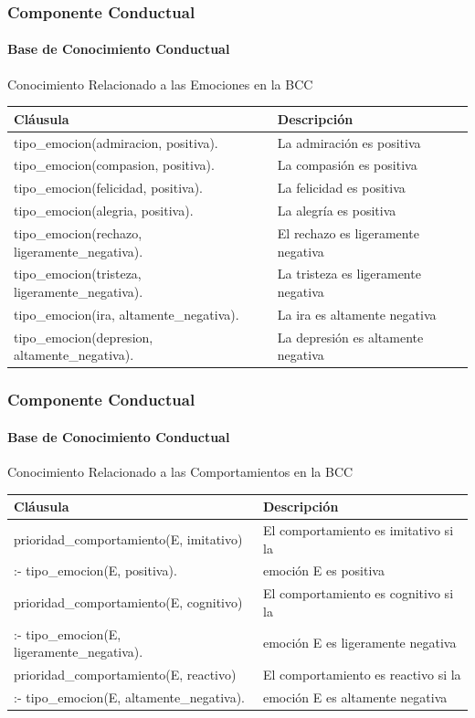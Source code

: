 \documentclass{beamer}
\begin{document}
\begin{frame}
\frametitle{Componente Conductual}
\framesubtitle{Base de Conocimiento Conductual}
\centering
Conocimiento Relacionado a las Emociones en la BCC
\begin{table}[!ht]
\centering
\tiny
\begin{tabular}{ll}
\hline
\scriptsize \bfseries Cláusula & \scriptsize \bfseries Descripción \\
\hline
\hline
tipo\_emocion(admiracion, positiva). & La admiración es positiva \\\hline
tipo\_emocion(compasion, positiva). & La compasión es positiva \\\hline
tipo\_emocion(felicidad, positiva). & La felicidad es positiva \\\hline
tipo\_emocion(alegria, positiva). & La alegría es positiva \\\hline
tipo\_emocion(rechazo, ligeramente\_negativa). & El rechazo es ligeramente negativa \\\hline
tipo\_emocion(tristeza, ligeramente\_negativa). & La tristeza es ligeramente negativa \\\hline
tipo\_emocion(ira, altamente\_negativa). & La ira es altamente negativa \\\hline
tipo\_emocion(depresion, altamente\_negativa). & La depresión es altamente negativa \\
\hline
\end{tabular}
\end{table}
\end{frame}

\begin{frame}
\frametitle{Componente Conductual}
\framesubtitle{Base de Conocimiento Conductual}
\centering
Conocimiento Relacionado a las Comportamientos en la BCC
\begin{table}[!ht]
\centering
\tiny
\begin{tabular}{ll}
\hline
\scriptsize \bfseries Cláusula & \scriptsize \bfseries Descripción \\
\hline
\hline
prioridad\_comportamiento(E, imitativo) & El comportamiento es imitativo si la \\
:- tipo\_emocion(E, positiva). & emoción E es positiva \\\hline
prioridad\_comportamiento(E, cognitivo) & El comportamiento es cognitivo si la \\
:- tipo\_emocion(E, ligeramente\_negativa). & emoción E es ligeramente negativa \\\hline
prioridad\_comportamiento(E, reactivo) &  El comportamiento es reactivo si la  \\
:- tipo\_emocion(E, altamente\_negativa). & emoción E es altamente negativa \\
\hline
\end{tabular}
\end{table}
\end{frame}
\end{document}
